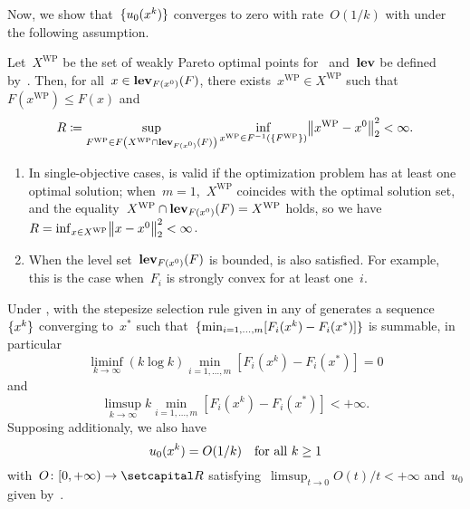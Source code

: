 \documentclass[../../main]{subfiles}
\begin{document}
Now, we show that~$\lbrace u_0(x^k)\rbrace$ converges to zero with rate~$O(1 / k)$ with  under the following assumption.
\begin{assumption} 
    Let~$X^{\text{WP}}$ be the set of weakly Pareto optimal points for~ and~$\operatorname{\mathbf{lev}}$ be defined by~.
    Then, for all~$x \in \operatorname{\mathbf{lev}}_{F(x^0)}(F)$, there exists~$x^{\text{WP}} \in X^{\text{WP}}$ such that~$F(x^{\text{WP}}) \le F(x)$ and
    \begin{equation} \label{eq:R}
        R \coloneqq \sup_{F^{\text{WP}} \in F\left(X^{\text{WP}} \cap \level_{F(x^0)}(F)\right)} \inf_{x^{\text{WP}} \in F^{-1}(\set{F^{\text{WP}}})} \norm*{x^{\text{WP}} - x^0}_2^2 < \infty
    .\end{equation}
\end{assumption}
\begin{remark}
    \begin{enumerate}
        \item In single-objective cases,  is valid if the optimization problem has at least one optimal solution; when~$m = 1$,~$X^{\text{WP}}$ coincides with the optimal solution set, and the equality~$X^{\text{WP}} \cap \operatorname{\mathbf{lev}}_{F(x^0)}(F) = X^{\text{WP}}$ holds, so we have~$R = \inf_{x \in X^{\text{WP}}} \norm*{x - x^0}_2^2 < \infty$.
        \item When the level set~$\operatorname{\mathbf{lev}}_{F(x^0)}(F)$ is bounded,  is also satisfied.
            For example, this is the case when~$F_i$ is strongly convex for at least one~$i$.
    \end{enumerate}
\end{remark}
\begin{theorem} 
    Under ,  with the stepesize selection rule given in any of  generates a sequence~$\lbrace x^k\rbrace$ converging to~$x^*$ such that~$\lbrace\min_{i = 1, \dots, m} [F_i(x^k) - F_i(x^*)]\rbrace$ is summable, in particular
    \begin{equation}
        \liminf_{k \to \infty} (k \log k) \min_{i = 1, \dots, m} \left[F_i(x^k) - F_i(x^*)\right] = 0
    \end{equation}
    and
    \begin{equation}
        \limsup_{k \to \infty} k \min_{i = 1, \dots, m} \left[F_i(x^k) - F_i(x^*)\right] < + \infty
    .\end{equation}
    Supposing  additionaly, we also have
    \begin{equation}
        u_0(x^k) = O(1 / k) \quad \text{for all~$k \ge 1$}
    \end{equation}
    with~$O \colon [0, + \infty) \to \setR$ satisfying~$\limsup_{t \to 0} O(t) / t < + \infty$ and~$u_0$ given by~.
\end{theorem}
\end{document}
